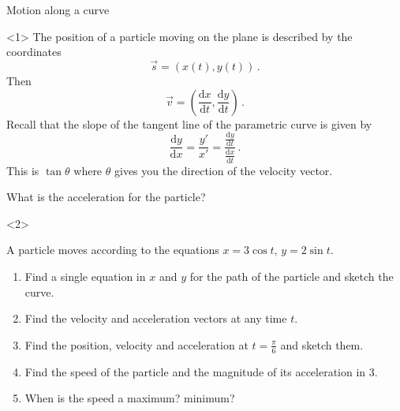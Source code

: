 \begin{frame}{Motion along a curve}
\begin{onlyenv}<1>
The position of a particle moving on the plane is described by the
coordinates
\[
\vec{s}=\left(x\left(t\right),y\left(t\right)\right)\,.
\]
Then
\[
\vec{v}=\left(\frac{\mathrm{d}x}{\mathrm{d}t},\frac{\mathrm{d}y}{\mathrm{d}t}\right)\,.
\]
Recall that the slope of the tangent line of the parametric curve
is given by
\[
\frac{\mathrm{d}y}{\mathrm{d}x}=\frac{y'}{x'}=\frac{\frac{\mathrm{d}y}{\mathrm{d}t}}{\frac{\mathrm{d}x}{\mathrm{d}t}}\,.
\]
This is $\tan\theta$ where $\theta$ gives you the direction of the
velocity vector.

\alert{What is the acceleration for the particle? }
\end{onlyenv}

\begin{onlyenv}<2>
\begin{example}
A particle moves according to the equations $x=3\cos t$, $y=2\sin t$.
\begin{enumerate}
\item Find a single equation in $x$ and $y$ for the path of the particle
and sketch the curve.
\item Find the velocity and acceleration vectors at any time $t$.
\item Find the position, velocity and acceleration at $t=\frac{\pi}{6}$
and sketch them.
\item Find the speed of the particle and the magnitude of its acceleration
in 3.
\item When is the speed a maximum? minimum?
\end{enumerate}

\end{example}

\end{onlyenv}

\end{frame}

